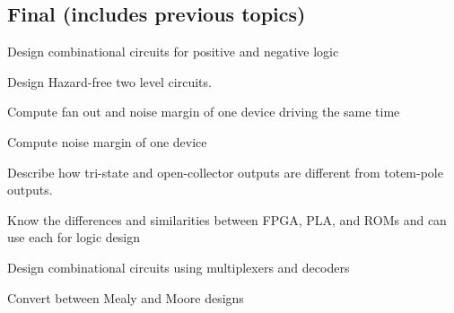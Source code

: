 \documentclass[options]{article}
\newcommand{\cmark}{\ding{51}}%
\newcommand{\done}{\rlap{$\square$}{\raisebox{2pt}{\large\hspace{1pt}\cmark}}%
  \hspace{-2.5pt}}
\begin{document}
\subsection{Final (includes previous topics)}
\begin{todolist}
\item[\done] Design combinational circuits for positive and negative logic
\item[\done] Design Hazard-free two level circuits.
\item[\done] Compute fan out and noise margin of one device driving the same time
\item[\done] Compute noise margin of one device
\item[\done] Describe how tri-state and open-collector outputs are different from totem-pole outputs.
\item[\done] Know the differences and similarities between FPGA, PLA, and ROMs and can use each for logic design
\item Design combinational circuits using multiplexers and decoders
\item Convert between Mealy and Moore designs
\end{todolist}

\end{document}
